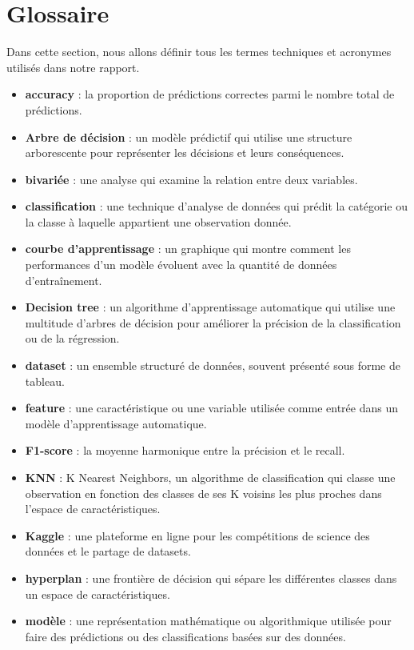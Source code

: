 \chapter*{Glossaire}

Dans cette section, nous allons définir tous les termes techniques et acronymes utilisés dans notre rapport.

\begin{itemize}
	\item \textbf{accuracy} : la proportion de prédictions correctes parmi le nombre total de prédictions.
	\item \textbf{Arbre de décision} : un modèle prédictif qui utilise une structure arborescente pour représenter les décisions et leurs conséquences.
	\item \textbf{bivariée} : une analyse qui examine la relation entre deux variables.
	\item \textbf{classification} : une technique d'analyse de données qui prédit la catégorie ou la classe à laquelle appartient une observation donnée.
	\item \textbf{courbe d'apprentissage} : un graphique qui montre comment les performances d'un modèle évoluent avec la quantité de données d'entraînement.
	\item \textbf{Decision tree} : un algorithme d'apprentissage automatique qui utilise une multitude d'arbres de décision pour améliorer la précision de la classification ou de la régression.
	\item \textbf{dataset} : un ensemble structuré de données, souvent présenté sous forme de tableau.
	\item \textbf{feature} : une caractéristique ou une variable utilisée comme entrée dans un modèle d'apprentissage automatique.
	\item \textbf{F1-score} : la moyenne harmonique entre la précision et le recall.
	\item \textbf{KNN} : K Nearest Neighbors, un algorithme de classification qui classe une observation en fonction des classes de ses K voisins les plus proches dans l'espace de caractéristiques.
	\item \textbf{Kaggle} : une plateforme en ligne pour les compétitions de science des données et le partage de datasets.
	\item \textbf{hyperplan} : une frontière de décision qui sépare les différentes classes dans un espace de caractéristiques.
	\item \textbf{modèle} : une représentation mathématique ou algorithmique utilisée pour faire des prédictions ou des classifications basées sur des données.

\end{itemize}
